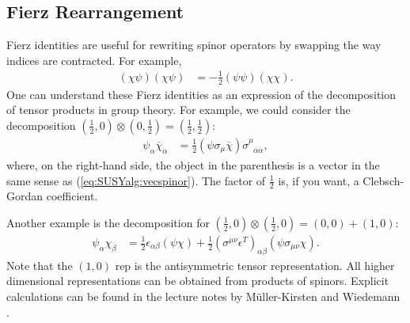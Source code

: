 \documentclass[12pt, oneside]{report}    %
\begin{document}
\subsection{Fierz Rearrangement}\label{sec:SUSYalg:Fierz}

Fierz identities are useful for rewriting spinor operators by swapping the way indices are contracted. For example,
\begin{align}
    (\chi\psi)(\chi\psi) &= -\frac 12 (\psi\psi)(\chi\chi)\label{eq:SUSYalg:Fierz:alphaalphadot}.
\end{align}
%
One can understand these Fierz identities as an expression of the decomposition of tensor products in group theory. For example, we could consider the decomposition $(\frac 12,0)\otimes(0,\frac 12)=(\frac 12, \frac 12)$:
\begin{align}
    \psi_\alpha\overline\chi_{\dot\alpha} &= \frac 12 (\psi\sigma_\mu\overline\chi)\sigma^{\mu}_{\phantom\mu\alpha\dot\alpha},\label{eq:SUSYalg:fierz:sigma}
\end{align}
where, on the right-hand side, the object in the parenthesis is a vector in the same sense as  (\ref{eq:SUSYalg:vecspinor}). The factor of $\frac 12$ is, if you want, a Clebsch-Gordan coefficient.

Another example is the decomposition for $(\frac 12,0)\otimes(\frac 12,0)=(0,0)+(1,0)$:
\begin{align}
    \psi_\alpha\chi_\beta &= \frac 12 \epsilon_{\alpha\beta}(\psi\chi) + \frac 12 (\sigma^{\mu\nu}\epsilon^T)_{\alpha\beta}(\psi\sigma_{\mu\nu}\chi).
\end{align}
Note that the $(1,0)$ rep is the antisymmetric tensor representation. All higher dimensional representations can be obtained from products of spinors. Explicit calculations can be found in the lecture notes by M\"uller-Kirsten and Wiedemann \cite{MullerKirsten:1986cw}.
\end{document}
